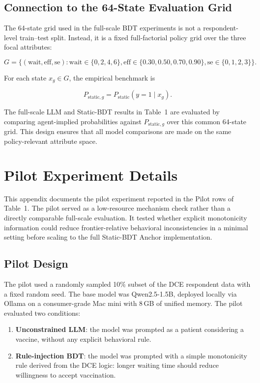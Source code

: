 \documentclass[11pt]{article}
\begin{document}
\subsection{Connection to the 64-State Evaluation Grid}

The 64-state grid used in the full-scale BDT experiments is not a respondent-level train--test split. Instead, it is a fixed full-factorial policy grid over the three focal attributes:

\[
G
=
\{(\text{wait}, \text{eff}, \text{se}) :
\text{wait} \in \{0,2,4,6\},
\text{eff} \in \{0.30,0.50,0.70,0.90\},
\text{se} \in \{0,1,2,3\}
\}.
\]

For each state \(x_g \in G\), the empirical benchmark is

\[
P_{\text{static},g}
=
P_{\text{static}}(y=1 \mid x_g).
\]

The full-scale LLM and Static-BDT results in Table~1 are evaluated by comparing agent-implied probabilities against \(P_{\text{static},g}\) over this common 64-state grid. This design ensures that all model comparisons are made on the same policy-relevant attribute space.



\section{Pilot Experiment Details}
\label{app:pilot}

This appendix documents the pilot experiment reported in the Pilot rows of Table~1. The pilot served as a low-resource mechanism check rather than a directly comparable full-scale evaluation. It tested whether explicit monotonicity information could reduce frontier-relative behavioral inconsistencies in a minimal setting before scaling to the full Static-BDT Anchor implementation.

\subsection{Pilot Design}

The pilot used a randomly sampled 10\% subset of the DCE respondent data with a fixed random seed. The base model was Qwen2.5-1.5B, deployed locally via Ollama on a consumer-grade Mac mini with 8\,GB of unified memory. The pilot evaluated two conditions:

\begin{enumerate}
    \item \textbf{Unconstrained LLM}: the model was prompted as a patient considering a vaccine, without any explicit behavioral rule.
    \item \textbf{Rule-injection BDT}: the model was prompted with a simple monotonicity rule derived from the DCE logic: longer waiting time should reduce willingness to accept vaccination.
\end{enumerate}
\end{document}
